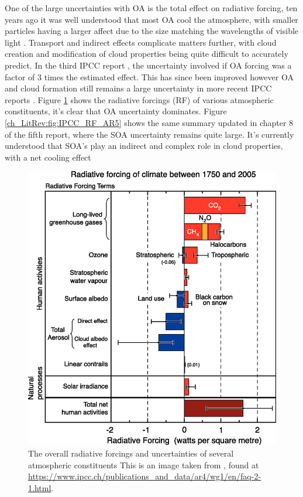     One of the large uncertainties with OA is the total effect on radiative forcing, ten years ago it was well understood that most OA cool the atmosphere, with smaller particles having a larger affect due to the size matching the wavelengths of visible light \citep{Kanakidou2005}. 
    Transport and indirect effects complicate matters further, with cloud creation and modification of cloud properties being quite difficult to accurately predict.
    In the third IPCC report \citep{IPCC2001}, the uncertainty involved if OA forcing was a factor of 3 times the estimated effect. 
    This has since been improved however OA and cloud formation still remains a large uncertainty in more recent IPCC reports \citep{IPCC_Chapter2}.
    Figure \ref{ch_LitRev:fig:IPCC_RF_AR4} shows the radiative forcings (RF) of various atmospheric constituents, it's clear that OA uncertainty dominates.
    Figure \ref{ch_LitRev:fig:IPCC_RF_AR5} shows the same summary updated in chapter 8 of the fifth report, where the SOA uncertainty remains quite large.
    It's currently understood that SOA's play an indirect and complex role in cloud properties, with a net cooling effect \citep[Chapter 7,8]{IPCC_AR5_WG1}
    
    \begin{figure}
      \includegraphics[width=\textwidth]{Figures/IPCC_WG1AR4_RFSummary.png}
      \caption{%
        The overall radiative forcings and uncertainties of several atmospheric constituents
	      This is an image taken from \cite{IPCC_Chapter2}, found at \url{https://www.ipcc.ch/publications_and_data/ar4/wg1/en/faq-2-1.html}.}
      \label{ch_LitRev:fig:IPCC_RF_AR4}
    \end{figure}


